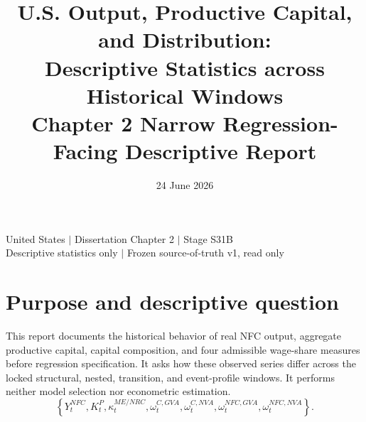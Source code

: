 \documentclass[11pt]{article}
\title{U.S. Output, Productive Capital, and Distribution:\\Descriptive Statistics across Historical Windows\\[0.5em]\large Chapter 2 Narrow Regression-Facing Descriptive Report}
\author{}
\date{24 June 2026}
\begin{document}
\maketitle
\begin{center}\small United States $\mid$ Dissertation Chapter 2 $\mid$ Stage S31B\\Descriptive statistics only $\mid$ Frozen source-of-truth v1, read only\end{center}
\tableofcontents
\clearpage
\section{Purpose and descriptive question}
This report documents the historical behavior of real NFC output, aggregate productive capital, capital composition, and four admissible wage-share measures before regression specification. It asks how these observed series differ across the locked structural, nested, transition, and event-profile windows. It performs neither model selection nor econometric estimation.
\[\left\{Y_t^{NFC},K_t^{P},\kappa_t^{ME/NRC},\omega_t^{C,GVA},\omega_t^{C,NVA},\omega_t^{NFC,GVA},\omega_t^{NFC,NVA}\right\}.\]
\end{document}
